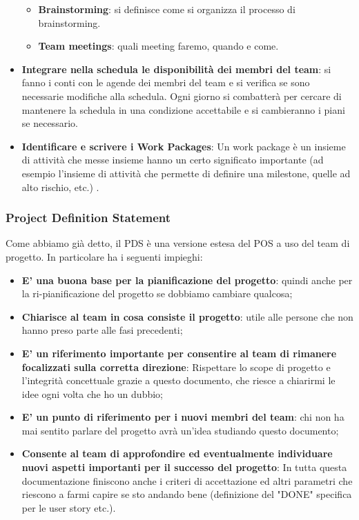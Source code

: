 \begin{itemize}
\begin{itemize}
		\item \textbf{Brainstorming}: si definisce come si organizza il processo di brainstorming.
		\item \textbf{Team meetings}: quali meeting faremo, quando e come.
	\end{itemize}
	\item \textbf{Integrare nella schedula le disponibilità dei membri del team}: si fanno i conti con le agende dei membri del team e si verifica se sono necessarie modifiche alla schedula. Ogni giorno si combatterà per cercare di mantenere la schedula in una condizione accettabile e si cambieranno i piani se necessario.
	\item \textbf{Identificare e scrivere i Work Packages}: Un work package è un insieme di attività che messe insieme hanno un certo significato importante (ad esempio l'insieme di attività che permette di definire una milestone, quelle ad alto rischio, etc.) .
\end{itemize}

\subsubsection{Project Definition Statement}
Come abbiamo già detto, il PDS è una versione estesa del POS a uso del team di progetto. In particolare ha i seguenti impieghi:
\begin{itemize}
	\item \textbf{E’ una buona base per la pianificazione del progetto}: quindi anche per la ri-pianificazione del progetto se dobbiamo cambiare qualcosa;
	\item \textbf{Chiarisce al team in cosa consiste il progetto}: utile alle persone che non hanno preso parte alle fasi precedenti;
	\item \textbf{E’ un riferimento importante per consentire al team di rimanere focalizzati sulla corretta direzione}: Rispettare lo scope di progetto e l'integrità concettuale grazie a questo documento, che riesce a chiarirmi le idee ogni volta che ho un dubbio;
	\item \textbf{E’ un punto di riferimento per i nuovi membri del team}: chi non ha mai sentito parlare del progetto avrà un'idea studiando questo documento;
	\item \textbf{Consente al team di approfondire ed eventualmente individuare nuovi aspetti importanti per il successo del progetto}: In tutta questa documentazione finiscono anche i criteri di accettazione ed altri parametri che riescono a farmi capire se sto andando bene (definizione del "DONE" specifica per le user story etc.).
\end{itemize}
